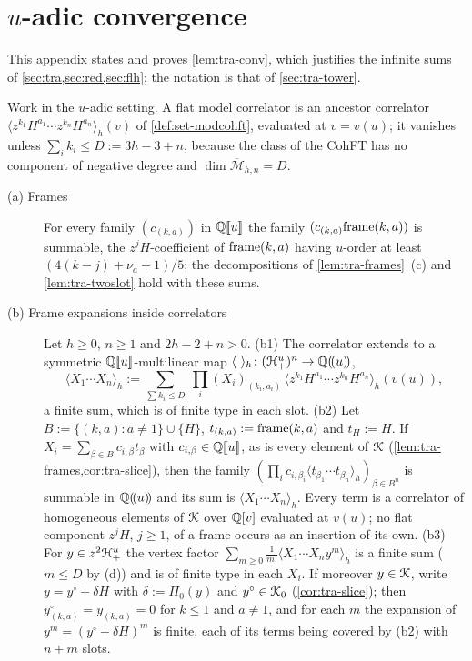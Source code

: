 
\section{$u$-adic convergence}
\label{sec:tra-convproof}

This appendix states and proves \cref{lem:tra-conv}, which justifies the infinite sums of \cref{sec:tra,sec:red,sec:flh}; the notation is that of \cref{sec:tra-tower}.

\begin{lem}
\label{lem:tra-conv}
Work in the $u$-adic setting. A flat model correlator is an ancestor correlator $\langle z^{k_1}H^{a_1}\cdots z^{k_n}H^{a_n}\rangle_h(v)$ of \cref{def:set-modcohft}, evaluated at $v = v(u)$; it vanishes unless $\sum_ik_i\leq D := 3h-3+n$, because the class of the CohFT has no component of negative degree and $\dim\overline{\mathcal M}_{h,n} = D$.
\begin{description}
\item[(a) Frames] For every family $(c_{(k,a)})$ in $\mathbb{Q}[\![ u ]\!]$ the family $(c_{(k,a)}\mathrm{frame}(k,a))$ is summable, the $z^jH$-coefficient of $\mathrm{frame}(k,a)$ having $u$-order at least $(4(k-j)+\nu_a+1)/5$; the decompositions of \cref{lem:tra-frames}~(c) and \cref{lem:tra-twoslot} hold with these sums.
\item[(b) Frame expansions inside correlators] Let $h\geq 0$, $n\geq 1$ and $2h-2+n>0$.
(b1) The correlator extends to a symmetric $\mathbb{Q}[\![ u ]\!]$-multilinear map $\langle\ \rangle_h\colon(\cH^u_+)^n\to\bbQ\lser{u}$,
\[
\langle X_1\cdots X_n\rangle_h := \sum_{\sum k_i\leq D}\ \prod_i(X_i)_{(k_i,a_i)}\,\langle z^{k_1}H^{a_1}\cdots z^{k_n}H^{a_n}\rangle_h(v(u)),
\]
a finite sum, which is of finite type in each slot.
(b2) Let $B := \{(k,a) : a\neq 1\}\cup\{H\}$, $t_{(k,a)} := \mathrm{frame}(k,a)$ and $t_H := H$. If $X_i = \sum_{\beta\in B}c_{i,\beta}t_\beta$ with $c_{i,\beta}\in\mathbb{Q}[\![ u ]\!]$, as is every element of $\mathcal{K}$ (\cref{lem:tra-frames,cor:tra-slice}), then the family $(\prod_ic_{i,\beta_i}\langle t_{\beta_1}\cdots t_{\beta_n}\rangle_h)_{\beta\in B^n}$ is summable in $\mathbb{Q}(\!(u)\!)$ and its sum is $\langle X_1\cdots X_n\rangle_h$. Every term is a correlator of homogeneous elements of $\mathcal{K}$ over $\mathbb{Q}[v]$ evaluated at $v(u)$; no flat component $z^jH$, $j\geq 1$, of a frame occurs as an insertion of its own.
(b3) For $y\in z^2\mathcal{H}^u_+$ the vertex factor $\sum_{m\geq 0}\frac1{m!}\langle X_1\cdots X_ny^m\rangle_h$ is a finite sum ($m\leq D$ by (d)) and is of finite type in each $X_i$. If moreover $y\in\mathcal{K}$, write $y = y^\circ+\delta H$ with $\delta := \Pi_0(y)$ and $y^\circ\in\mathcal{K}_{0}$ (\cref{cor:tra-slice}); then $y^\circ_{(k,a)} = y_{(k,a)} = 0$ for $k\leq 1$ and $a\neq 1$, and for each $m$ the expansion of $y^m = (y^\circ+\delta H)^m$ is finite, each of its terms being covered by (b2) with $n+m$ slots.

\end{description}
\end{lem}
